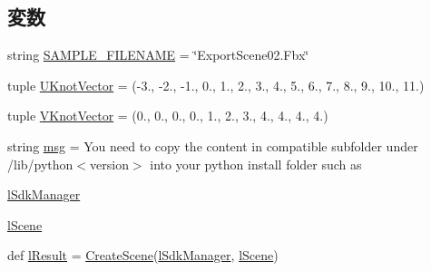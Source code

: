 \subsection*{変数}
\begin{DoxyCompactItemize}
\item 
string \hyperlink{namespace_export_scene02_a67d274d703fe5127e40b76816e2f86c8}{S\+A\+M\+P\+L\+E\+\_\+\+F\+I\+L\+E\+N\+A\+ME} = \char`\"{}Export\+Scene02.\+Fbx\char`\"{}
\item 
tuple \hyperlink{namespace_export_scene02_a92edce8be8a781200f5192ca4fd310d6}{U\+Knot\+Vector} = (-\/3., -\/2., -\/1., 0., 1., 2., 3., 4., 5., 6., 7., 8., 9., 10., 11.)
\item 
tuple \hyperlink{namespace_export_scene02_aff5399eb97f9d86cc8db1b7ba56a8ad0}{V\+Knot\+Vector} = (0., 0., 0., 0., 1., 2., 3., 4., 4., 4., 4.)
\item 
string \hyperlink{namespace_export_scene02_aef2ce38b70d2e455ca6afaa826462b91}{msg} = \textquotesingle{}You need to copy the content in compatible subfolder under /lib/python$<$version$>$ into your python install folder such as \textquotesingle{}
\item 
\hyperlink{namespace_export_scene02_ae94b7d754208f6a389c4641865d95b00}{l\+Sdk\+Manager}
\item 
\hyperlink{namespace_export_scene02_aa5d8616f7025fcaf75014eeb9d265149}{l\+Scene}
\item 
def \hyperlink{namespace_export_scene02_ae01fe90d372cb2ce82553950685edcea}{l\+Result} = \hyperlink{namespace_export_scene02_ab05e0f19c09bbd1997ef575f237d317e}{Create\+Scene}(\hyperlink{namespace_export_scene02_ae94b7d754208f6a389c4641865d95b00}{l\+Sdk\+Manager}, \hyperlink{namespace_export_scene02_aa5d8616f7025fcaf75014eeb9d265149}{l\+Scene})
\end{DoxyCompactItemize}


